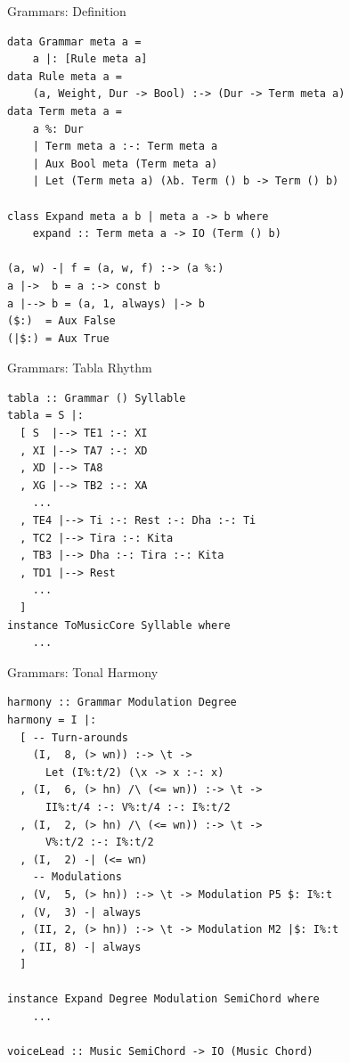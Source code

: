 \documentclass{beamer}
\begin{document}
	\begin{frame}[fragile=singleslide]{Grammars: Definition}
	\begin{verbatim}
data Grammar meta a =
    a |: [Rule meta a]
data Rule meta a =
    (a, Weight, Dur -> Bool) :-> (Dur -> Term meta a)
data Term meta a =
    a %: Dur
    | Term meta a :-: Term meta a
    | Aux Bool meta (Term meta a)
    | Let (Term meta a) (λb. Term () b -> Term () b)

class Expand meta a b | meta a -> b where
    expand :: Term meta a -> IO (Term () b)

(a, w) -| f = (a, w, f) :-> (a %:)
a |->  b = a :-> const b
a |--> b = (a, 1, always) |-> b
($:)  = Aux False
(|$:) = Aux True
	\end{verbatim}
	\end{frame}

	\begin{frame}[fragile=singleslide]{Grammars: Tabla Rhythm}
	\begin{verbatim}
tabla :: Grammar () Syllable
tabla = S |:
  [ S  |--> TE1 :-: XI
  , XI |--> TA7 :-: XD
  , XD |--> TA8
  , XG |--> TB2 :-: XA
    ...
  , TE4 |--> Ti :-: Rest :-: Dha :-: Ti
  , TC2 |--> Tira :-: Kita
  , TB3 |--> Dha :-: Tira :-: Kita
  , TD1 |--> Rest
    ...
  ]
instance ToMusicCore Syllable where
    ...
	\end{verbatim}
	\end{frame}

	\begin{frame}[fragile=singleslide]{Grammars: Tonal Harmony}
	\begin{verbatim}
harmony :: Grammar Modulation Degree
harmony = I |:
  [ -- Turn-arounds
    (I,  8, (> wn)) :-> \t ->
      Let (I%:t/2) (\x -> x :-: x)
  , (I,  6, (> hn) /\ (<= wn)) :-> \t ->
      II%:t/4 :-: V%:t/4 :-: I%:t/2
  , (I,  2, (> hn) /\ (<= wn)) :-> \t ->
      V%:t/2 :-: I%:t/2
  , (I,  2) -| (<= wn)
    -- Modulations
  , (V,  5, (> hn)) :-> \t -> Modulation P5 $: I%:t
  , (V,  3) -| always
  , (II, 2, (> hn)) :-> \t -> Modulation M2 |$: I%:t
  , (II, 8) -| always
  ]

instance Expand Degree Modulation SemiChord where
    ...

voiceLead :: Music SemiChord -> IO (Music Chord)
	\end{verbatim}
	\end{frame}
\end{document}
